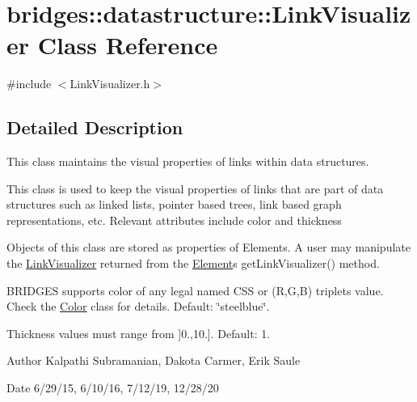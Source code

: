 \hypertarget{classbridges_1_1datastructure_1_1_link_visualizer}{}\section{bridges\+:\+:datastructure\+:\+:Link\+Visualizer Class Reference}
\label{classbridges_1_1datastructure_1_1_link_visualizer}


{\ttfamily \#include $<$Link\+Visualizer.\+h$>$}



\subsection{Detailed Description}
This class maintains the visual properties of links within data structures. 

This class is used to keep the visual properties of links that are part of data structures such as linked lists, pointer based trees, link based graph representations, etc. Relevant attributes include color and thickness

Objects of this class are stored as properties of Elements. A user may manipulate the \hyperlink{classbridges_1_1datastructure_1_1_link_visualizer}{Link\+Visualizer} returned from the \hyperlink{classbridges_1_1datastructure_1_1_element}{Element}\textquotesingle{}s get\+Link\+Visualizer() method.

B\+R\+I\+D\+G\+ES supports color of any legal named C\+SS or (R,G,B) triplets value. Check the \hyperlink{classbridges_1_1datastructure_1_1_color}{Color} class for details. Default\+: \char`\"{}steelblue\char`\"{}.

Thickness values must range from \mbox{]}0.,10.\mbox{]}. Default\+: 1.

\begin{DoxyAuthor}{Author}
Kalpathi Subramanian, Dakota Carmer, Erik Saule 
\end{DoxyAuthor}
\begin{DoxyDate}{Date}
6/29/15, 6/10/16, 7/12/19, 12/28/20 
\end{DoxyDate}
